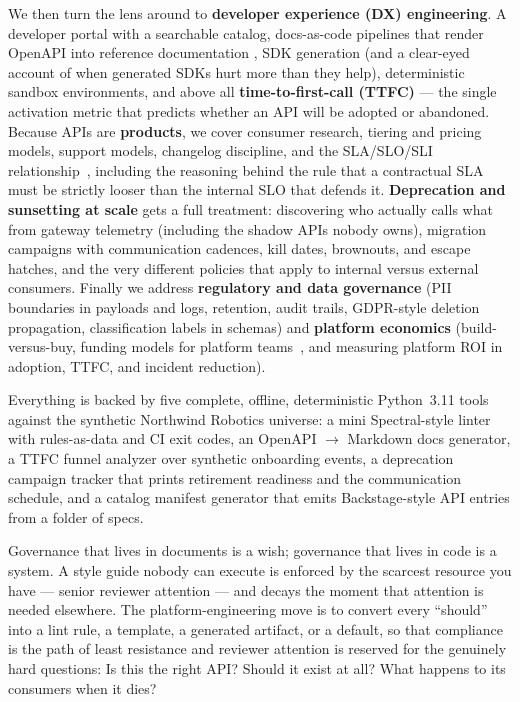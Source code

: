 We then turn the lens around to \textbf{developer experience (DX)
engineering}. A developer portal with a searchable catalog, docs-as-code
pipelines that render OpenAPI into reference documentation
\cite{openapi31}, SDK generation (and a clear-eyed account of when
generated SDKs hurt more than they help), deterministic sandbox
environments, and above all \textbf{time-to-first-call (TTFC)} --- the
single activation metric that predicts whether an API will be adopted or
abandoned. Because APIs are \textbf{products}, we cover consumer research,
tiering and pricing models, support models, changelog discipline, and the
SLA/SLO/SLI relationship~\cite{beyer2016sre}, including the reasoning
behind the rule that a contractual SLA must be strictly looser than the
internal SLO that defends it. \textbf{Deprecation and sunsetting at scale}
gets a full treatment: discovering who actually calls what from gateway
telemetry (including the shadow APIs nobody owns), migration campaigns
with communication cadences, kill dates, brownouts, and escape hatches,
and the very different policies that apply to internal versus external
consumers. Finally we address \textbf{regulatory and data governance}
(PII boundaries in payloads and logs, retention, audit trails, GDPR-style
deletion propagation, classification labels in schemas) and
\textbf{platform economics} (build-versus-buy, funding models for platform
teams~\cite{newman2021microservices}, and measuring platform ROI in
adoption, TTFC, and incident reduction).

Everything is backed by five complete, offline, deterministic Python~3.11
tools against the synthetic Northwind Robotics universe: a mini
Spectral-style linter with rules-as-data and CI exit codes, an OpenAPI
$\rightarrow$ Markdown docs generator, a TTFC funnel analyzer over
synthetic onboarding events, a deprecation campaign tracker that prints
retirement readiness and the communication schedule, and a catalog
manifest generator that emits Backstage-style API entries from a folder of
specs.

\begin{keyconceptbox}
Governance that lives in documents is a wish; governance that lives in
code is a system. A style guide nobody can execute is enforced by the
scarcest resource you have --- senior reviewer attention --- and decays
the moment that attention is needed elsewhere. The platform-engineering
move is to convert every ``should'' into a lint rule, a template, a
generated artifact, or a default, so that compliance is the path of least
resistance and reviewer attention is reserved for the genuinely hard
questions: Is this the right API? Should it exist at all? What happens to
its consumers when it dies?
\end{keyconceptbox}

